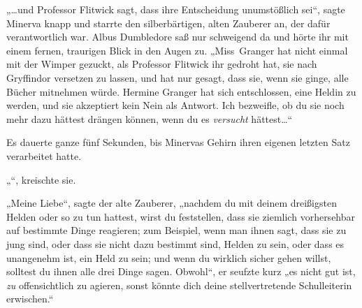 
„…und Professor Flitwick sagt, dass ihre Entscheidung unumstößlich sei“, sagte Minerva knapp und starrte den silberbärtigen, alten Zauberer an, der dafür verantwortlich war. Albus Dumbledore saß nur schweigend da und hörte ihr mit einem fernen, traurigen Blick in den Augen zu. „Miss~Granger hat nicht einmal mit der Wimper gezuckt, als Professor Flitwick ihr gedroht hat, sie nach Gryffindor versetzen zu lassen, und hat nur gesagt, dass sie, wenn sie ginge, alle Bücher mitnehmen würde. Hermine Granger hat sich entschlossen, eine Heldin zu werden, und sie akzeptiert kein Nein als Antwort. Ich bezweifle, ob du sie noch mehr dazu hättest drängen können, wenn du es \emph{versucht} hättest…“

Es dauerte ganze fünf Sekunden, bis Minervas Gehirn ihren eigenen letzten Satz verarbeitet hatte.

„“, kreischte sie.

„Meine Liebe“, sagte der alte Zauberer, „nachdem du mit deinem dreißigsten Helden oder so zu tun hattest, wirst du feststellen, dass sie ziemlich vorhersehbar auf bestimmte Dinge reagieren; zum Beispiel, wenn man ihnen sagt, dass sie zu jung sind, oder dass sie nicht dazu bestimmt sind, Helden zu sein, oder dass es unangenehm ist, ein Held zu sein; und wenn du wirklich sicher gehen willst, solltest du ihnen alle drei Dinge sagen. Obwohl“, er seufzte kurz „es nicht gut ist, \emph{zu} offensichtlich zu agieren, sonst könnte dich deine stellvertretende Schulleiterin erwischen.“

